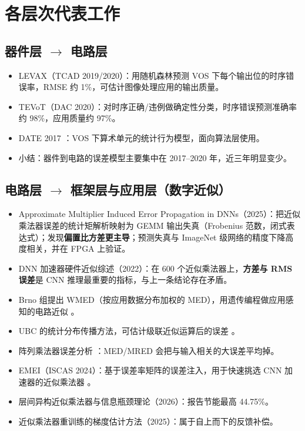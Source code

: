\documentclass[11pt,a4paper]{ctexart}
\begin{document}
\section{各层次代表工作}

\subsection{器件层 $\rightarrow$ 电路层}
\begin{itemize}[leftmargin=*]
  \item LEVAX（TCAD 2019/2020）\cite{levax}：用随机森林预测 VOS 下每个输出位的时序错误率，RMSE 约 1\%，可估计图像处理应用的输出质量。
  \item TEVoT（DAC 2020）\cite{tevot}：对时序正确/违例做确定性分类，时序错误预测准确率约 98\%，应用质量约 97\%。
  \item DATE 2017 \cite{date2017vos}：VOS 下算术单元的统计行为模型，面向算法层使用。
  \item 小结：器件到电路的误差模型主要集中在 2017--2020 年，近三年明显变少。
\end{itemize}

\subsection{电路层 $\rightarrow$ 框架层与应用层（数字近似）}
\begin{itemize}[leftmargin=*]
  \item Approximate Multiplier Induced Error Propagation in DNNs（2025）\cite{amierr}：把近似乘法器误差的统计矩解析映射为 GEMM 输出失真（Frobenius 范数，闭式表达式）；发现\textbf{偏置比方差更主导}；预测失真与 ImageNet 级网络的精度下降高度相关，并在 FPGA 上验证。
  \item DNN 加速器硬件近似综述（2022）\cite{hwapproxsurvey}：在 600 个近似乘法器上，\textbf{方差与 RMS 误差}是 CNN 推理最重要的指标，与上一条结论存在矛盾。
  \item Brno 组提出 WMED（按应用数据分布加权的 MED），用遗传编程做应用感知的电路近似 \cite{brnowmed}。
  \item UBC 的统计分布传播方法，可估计级联近似运算后的误差 \cite{ubcprop}。
  \item 阵列乘法器误差分析 \cite{arraymult}：MED/MRED 会把与输入相关的大误差平均掉。
  \item EMEI（ISCAS 2024）：基于误差率矩阵的误差注入，用于快速挑选 CNN 加速器的近似乘法器 \cite{emei}。
  \item 层间异构近似乘法器与信息瓶颈理论（2026）\cite{ibmult}：报告节能最高 44.75\%。
  \item 近似乘法器重训练的梯度估计方法（2025）\cite{gradest}：属于自上而下的反馈补偿。
\end{itemize}
\end{document}
